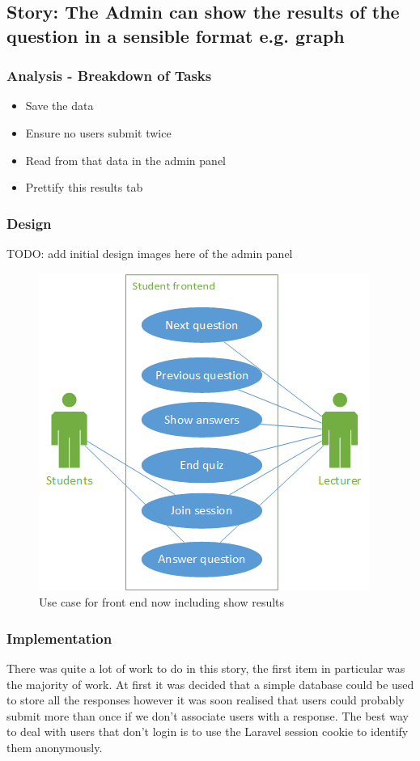 \subsection{Story: The Admin can show the results of the question in a sensible format e.g. graph}
\subsubsection{Analysis - Breakdown of Tasks}
\begin{itemize}
	\item Save the data
	\item Ensure no users submit twice
	\item Read from that data in the admin panel
	\item Prettify this results tab
\end{itemize}
\subsubsection{Design}
TODO: add initial design images here of the admin panel
\begin{figure}
	\caption{Use case for front end now including show results}
	\centerline{\includegraphics{Chapter2/Iter-6/iter-6-frontend-use-case}}
	\label{fig:iter-6-frontend-use-case}
\end{figure}
\subsubsection{Implementation}
There was quite a lot of work to do in this story, the first item in particular was the majority of work. At first it was decided that a simple database could be used to store all the responses however it was soon realised that users could probably submit more than once if we don't associate users with a response. The best way to deal with users that don't login is to use the Laravel session cookie to identify them anonymously.

